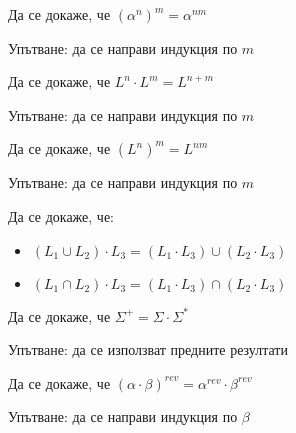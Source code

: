 \begin{problem}
Да се докаже, че $(\alpha^n)^m = \alpha^{nm}$

Упътване: да се направи индукция по $m$
\end{problem}

\begin{problem}
Да се докаже, че $L^n \cdot L^m = L^{n + m}$

Упътване: да се направи индукция по $m$
\end{problem}


\begin{problem}
Да се докаже, че $(L^n)^m = L^{nm}$

Упътване: да се направи индукция по $m$
\end{problem}

\begin{problem}[дистрибутивност]
Да се докаже, че:
\begin{itemize}
    \item $(L_1 \cup L_2) \cdot L_3 = (L_1 \cdot L_3) \cup (L_2 \cdot L_3)$
    \item $(L_1 \cap L_2) \cdot L_3 = (L_1 \cdot L_3) \cap (L_2 \cdot L_3)$
\end{itemize}
\end{problem}

\begin{problem}
Да се докаже, че $\Sigma^+ = \Sigma \cdot \Sigma^*$

Упътване: да се използват предните резултати
\end{problem}

\begin{problem}
Да се докаже, че $(\alpha \cdot \beta)^{rev} = \alpha^{rev} \cdot \beta^{rev}$

Упътване: да се направи индукция по $\beta$
\end{problem}

